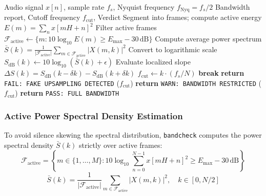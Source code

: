 \documentclass[10pt,journal,compsoc]{IEEEtran}
\begin{document}
\begin{algorithm}[t]
\caption{\texttt{bandcheck}: Log-Spectral Slope Brickwall Analysis}
\label{alg:bandcheck}
\begin{algorithmic}[1]
\REQUIRE Audio signal $x[n]$, sample rate $f_s$, Nyquist frequency $f_{\text{Nyq}} = f_s / 2$
\ENSURE Bandwidth report, Cutoff frequency $f_{\text{cut}}$, Verdict
\STATE Segment into frames; compute active energy $E(m) = \sum_{n} x[mH + n]^2$
\STATE Filter active frames $\mathcal{F}_{\text{active}} \leftarrow \{m : 10 \log_{10} E(m) \ge E_{\max} - 30\,\text{dB}\}$
\STATE Compute average power spectrum $\bar{S}(k) = \frac{1}{|\mathcal{F}_{\text{active}}|} \sum_{m \in \mathcal{F}_{\text{active}}} |X(m, k)|^2$
\STATE Convert to logarithmic scale $S_{\text{dB}}(k) \leftarrow 10 \log_{10}(\bar{S}(k) + \epsilon)$
    \STATE Evaluate localized slope $\Delta S(k) = S_{\text{dB}}(k - \delta k) - S_{\text{dB}}(k + \delta k)$
        \STATE $f_{\text{cut}} \leftarrow k \cdot (f_s / N)$
        \STATE \textbf{break}
    \ENDIF
\ENDFOR
{}
    \STATE \textbf{return} \texttt{FAIL: FAKE UPSAMPLING DETECTED} ($f_{\text{cut}}$)
    \STATE \textbf{return} \texttt{WARN: BANDWIDTH RESTRICTED} ($f_{\text{cut}}$)
\ELSE
    \STATE \textbf{return} \texttt{PASS: FULL BANDWIDTH}
\ENDIF
\end{algorithmic}
\end{algorithm}

\subsubsection{Active Power Spectral Density Estimation}
To avoid silence skewing the spectral distribution, \texttt{bandcheck} computes the power spectral density $\bar{S}(k)$ strictly over active frames:
\begin{equation}
\mathcal{F}_{\text{active}} = \left\{ m \in \{1, \dots, M\} : 10 \log_{10} \sum_{n=0}^{N-1} x[mH + n]^2 \ge E_{\max} - 30\,\text{dB} \right\}
\label{eq:active_frames}
\end{equation}
\begin{equation}
\bar{S}(k) = \frac{1}{|\mathcal{F}_{\text{active}}|} \sum_{m \in \mathcal{F}_{\text{active}}} |X(m, k)|^2, \quad k \in [0, N/2]
\label{eq:psd}
\end{equation}
\end{document}

